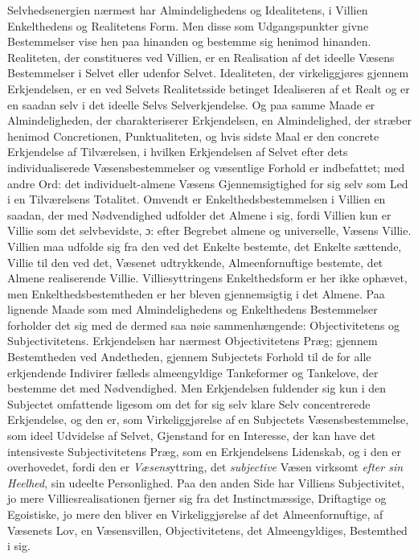 \documentclass[12pt,a4paper]{book}
\newcommand{\opage}[1]{\marginnote{\footnotesize\textit{[#1]}}}
\begin{document}
Selvhedsenergien nærmest har Almindelighedens og Idealitetens, i
Villien Enkelthedens og Realitetens Form. Men disse som Udgangspunkter
givne Bestemmelser vise hen paa hinanden og bestemme sig henimod
hinanden. Realiteten, der constitueres ved Villien, er en Realisation
af det ideelle Væsens Bestemmelser i Selvet eller udenfor Selvet.
Idealiteten, der virkeliggjøres gjennem Erkjendelsen, er en ved
Selvets Realitetsside betinget Idealiseren af et Realt og er en saadan
selv i det ideelle Selvs Selverkjendelse. Og paa samme Maade er
Almindeligheden, der charakteriserer Erkjendelsen, en Almindelighed, der
stræber henimod Concretionen, Punktualiteten, og hvis \opage{136}sidste Maal er
den concrete Erkjendelse af Tilværelsen, i hvilken Erkjendelsen af Selvet
efter dets individualiserede Væsensbestemmelser og væsentlige Forhold
er indbefattet; med andre Ord: det individuelt-almene Væsens
Gjennemsigtighed for sig selv som Led i en Tilværelsens Totalitet.
Omvendt er Enkelthedsbestemmelsen i Villien en saadan, der med
Nødvendighed udfolder det Almene i sig, fordi Villien kun er Villie som
det selvbevidste, ɔ: efter Begrebet almene og universelle, Væsens
Villie. Villien maa udfolde sig fra den ved det Enkelte bestemte, det
Enkelte sættende, Villie til den ved det, Væsenet udtrykkende,
Almeenfornuftige bestemte, det Almene realiserende Villie.
Villiesyttringens Enkelthedsform er her ikke ophævet, men
Enkelthedsbestemtheden er her bleven gjennemsigtig i det Almene. Paa
lignende Maade som med Almindelighedens og Enkelthedens Bestemmelser
forholder det sig med de dermed saa nøie sammenhængende:
Objectivitetens og Subjectivitetens. Erkjendelsen har nærmest
Objectivitetens Præg; gjennem Bestemtheden ved Andetheden, gjennem
Subjectets Forhold til de for alle erkjendende Indivirer fælleds
almeengyldige Tankeformer og Tankelove, der bestemme det med
Nødvendighed. Men Erkjendelsen fuldender sig kun i den Subjectet
omfattende ligesom om det for sig selv klare Selv concentrerede
Erkjendelse, og den er, som Virkeliggjørelse af en Subjectets
Væsensbestemmelse, som ideel Udvidelse af Selvet, Gjenstand for en
Interesse, der kan have det intensiveste Subjectivitetens Præg, som en
Erkjendelsens Lidenskab, og i den er overhovedet, fordi den er
\emph{Væsens}yttring, det \emph{subjective} Væsen virksomt \emph{efter sin Heelhed}, sin udeelte Personlighed. Paa den anden Side har Villiens Subjectivitet, jo
mere Villiesrealisationen fjerner sig fra det Instinctmæssige,
Driftagtige og Egoistiske, jo mere den bliver en Virkeliggjørelse af
det Almeenfornuftige, af Væsenets Lov, en Væsensvillen, Objectivitetens,
det Almeengyldiges, Bestemthed i sig.
\end{document}
